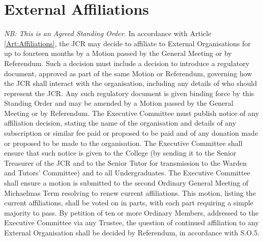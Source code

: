 \chapter{External Affiliations}
\textit{NB: This is an Agreed Standing Order.}
\npara In accordance with Article \ref{Art:Affiliations}, the JCR may decide to affiliate to External Organisations for up to fourteen months by a Motion passed by the General Meeting or by Referendum.  Such a decision must include a decision to introduce a regulatory document, approved as part of the same Motion or Referendum, governing how the JCR shall interact with the organisation, including any details of who should represent the JCR.  Any such regulatory document is given binding force by this Standing Order and may be amended by a Motion passed by the General Meeting or by Referendum.
\npara The Executive Committee must publish notice of any affiliation decision, stating the name of the organisation and details of any subscription or similar fee paid or proposed to be paid and of any donation made or proposed to be made to the organisation.  The Executive Committee shall ensure that such notice is given to the College (by sending it to the Senior Treasurer of the JCR and to the Senior Tutor for transmission to the Warden and Tutors' Committee) and to all Undergraduates.
\npara The Executive Committee shall ensure a motion is submitted to the second Ordinary General Meeting of Michaelmas Term resolving to renew current affiliations. This motion, listing the current affiliations, shall be voted on in parts, with each part requiring a simple majority to pass.
\npara By petition of ten or more Ordinary Members, addressed to the Executive Committee via any Trustee, the question of continued affiliation to any External Organisation shall be decided by Referendum, in accordance with S.O.5.
